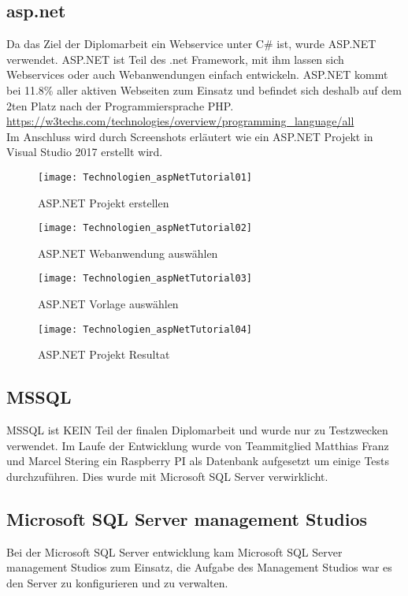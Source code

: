 \subsection {asp.net}
\label{sec:asp.net}
Da das Ziel der Diplomarbeit ein Webservice unter C\# ist, wurde ASP.NET verwendet. ASP.NET ist Teil des .net Framework, mit ihm lassen sich Webservices oder auch Webanwendungen einfach entwickeln. ASP.NET kommt bei 11.8\% aller aktiven Webseiten zum Einsatz und befindet sich deshalb auf dem 2ten Platz nach der Programmiersprache PHP. 
\url {https://w3techs.com/technologies/overview/programming_language/all} %
\\ Im Anschluss wird durch Screenshots erläutert wie ein ASP.NET Projekt in Visual Studio 2017 erstellt wird.
\begin{figure}[h]
    \texttt{[image: Technologien\_aspNetTutorial01]}
    \caption{ASP.NET Projekt erstellen}
    \label{fig:aspNetTut01}
\end{figure}
\begin{figure}[h]
    \texttt{[image: Technologien\_aspNetTutorial02]}
    \caption{ASP.NET Webanwendung auswählen}
    \label{fig:aspNetTut02}
\end{figure}
\begin{figure}[H]
    \texttt{[image: Technologien\_aspNetTutorial03]}
    \caption{ASP.NET Vorlage auswählen}
    \label{fig:aspNetTut03}
\end{figure}
\begin{figure}[h]
    \texttt{[image: Technologien\_aspNetTutorial04]}
    \caption{ASP.NET Projekt Resultat}
    \label{fig:aspNetTut04}
\end{figure}
\subsection {MSSQL}
\label{sec:MSSQL}
MSSQL ist KEIN Teil der finalen Diplomarbeit und wurde nur zu Testzwecken verwendet. Im Laufe der Entwicklung wurde von Teammitglied Matthias Franz und Marcel Stering ein Raspberry PI als Datenbank aufgesetzt um einige Tests durchzuführen. Dies wurde mit Microsoft SQL Server verwirklicht. 
\subsection {Microsoft SQL Server management Studios}
\label{sec:VisualStudio17Community}
Bei der Microsoft SQL Server entwicklung kam Microsoft SQL Server management Studios zum Einsatz, die Aufgabe des Management Studios war es den Server zu konfigurieren und zu verwalten. 
